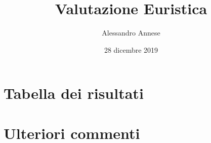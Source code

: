 \documentclass[french]{article}
\title{Valutazione Euristica}
\author{Alessandro Annese}
\date{28 dicembre 2019}
\begin{document}
\maketitle

\section{Tabella dei risultati}



\section{Ulteriori commenti}
\end{document}
